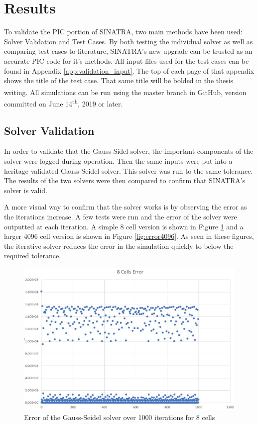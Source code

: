 \section{Results}

To validate the PIC portion of SINATRA, two main methods have been used: Solver Validation and Test Cases. By both testing the individual solver as well as comparing test cases to literature, SINATRA's new upgrade can be trusted as an accurate PIC code for it's methods. All input files used for the test cases can be found in Appendix \ref{app:validation_input}. The top of each page of that appendix shows the title of the test case. That same title will be bolded in the thesis writing. All simulations can be run using the master branch in GitHub\textsuperscript{\textregistered}, version committed on June 14\textsuperscript{th}, 2019 or later.

\subsection{Solver Validation}

In order to validate that the Gauss-Sidel solver, the important components of the solver were logged during operation. Then the same inputs were put into a heritage validated Gauss-Seidel solver. This solver was run to the same tolerance. The results of the two solvers were then compared to confirm that SINATRA's solver is valid. \par




\indent A more visual way to confirm that the solver works is by observing the error as the iterations increase. A few tests were run and the error of the solver were outputted at each iteration. A simple 8 cell version is shown in Figure \ref{fig:error8} and a larger 4096 cell version is shown in Figure \ref{fig:error4096}. As seen in these figures, the iterative solver reduces the error in the simulation quickly to below the required tolerance. 


\begin{figure}
\includegraphics[width=.95\textwidth]{figures/error8.JPG}
\centering
\caption{Error of the Gauss-Seidel solver over 1000 iterations for 8 cells}
\label{fig:error8}
\end{figure}


